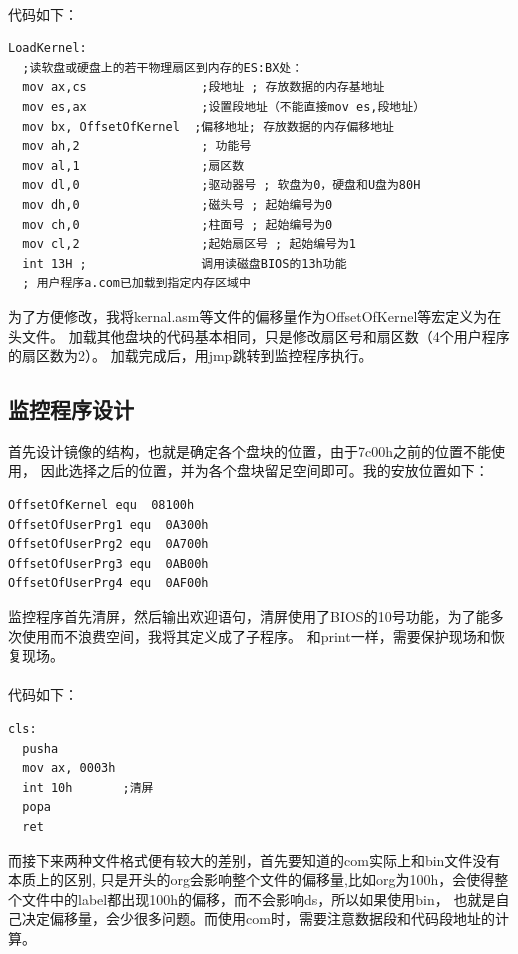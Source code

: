 \documentclass[a4paper, 11pt]{article} %
\begin{document}
\paragraph{}
代码如下：
\begin{lstlisting}[language={[x86masm]Assembler},caption=加载盘块到内存中]
LoadKernel:
  ;读软盘或硬盘上的若干物理扇区到内存的ES:BX处：
  mov ax,cs                ;段地址 ; 存放数据的内存基地址
  mov es,ax                ;设置段地址（不能直接mov es,段地址）
  mov bx, OffsetOfKernel  ;偏移地址; 存放数据的内存偏移地址
  mov ah,2                 ; 功能号
  mov al,1                 ;扇区数
  mov dl,0                 ;驱动器号 ; 软盘为0，硬盘和U盘为80H
  mov dh,0                 ;磁头号 ; 起始编号为0
  mov ch,0                 ;柱面号 ; 起始编号为0
  mov cl,2                 ;起始扇区号 ; 起始编号为1
  int 13H ;                调用读磁盘BIOS的13h功能
  ; 用户程序a.com已加载到指定内存区域中
\end{lstlisting}

为了方便修改，我将kernal.asm等文件的偏移量作为OffsetOfKernel等宏定义为在头文件。
加载其他盘块的代码基本相同，只是修改扇区号和扇区数（4个用户程序的扇区数为2）。
加载完成后，用jmp跳转到监控程序执行。

\subsection{监控程序设计}
首先设计镜像的结构，也就是确定各个盘块的位置，由于7c00h之前的位置不能使用，
因此选择之后的位置，并为各个盘块留足空间即可。我的安放位置如下：

\begin{lstlisting}[language={[x86masm]Assembler},caption=偏移量宏]
OffsetOfKernel equ  08100h
OffsetOfUserPrg1 equ  0A300h
OffsetOfUserPrg2 equ  0A700h
OffsetOfUserPrg3 equ  0AB00h
OffsetOfUserPrg4 equ  0AF00h
\end{lstlisting}


监控程序首先清屏，然后输出欢迎语句，清屏使用了BIOS的10号功能，为了能多次使用而不浪费空间，我将其定义成了子程序。
和print一样，需要保护现场和恢复现场。
\paragraph{}
代码如下：
\begin{lstlisting}[language={[x86masm]Assembler},caption=清屏]
  cls:         
  pusha
  mov ax, 0003h
  int 10h       ;清屏
  popa
  ret
\end{lstlisting}

而接下来两种文件格式便有较大的差别，首先要知道的com实际上和bin文件没有本质上的区别,
只是开头的org会影响整个文件的偏移量,比如org为100h，会使得整个文件中的label都出现100h的偏移，而不会影响ds，所以如果使用bin，
也就是自己决定偏移量，会少很多问题。而使用com时，需要注意数据段和代码段地址的计算。
\end{document}
